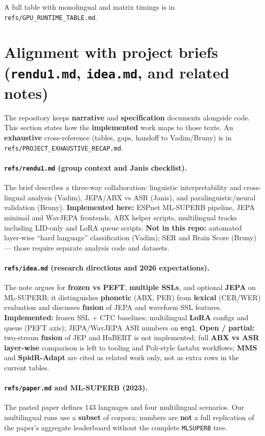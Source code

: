 \documentclass[11pt,a4paper]{article}
\begin{document}
\noindent A full table with monolingual and matrix timings is in \texttt{refs/GPU\_RUNTIME\_TABLE.md}.

\section{Alignment with project briefs (\texttt{rendu1.md}, \texttt{idea.md}, and related notes)}
The repository keeps \textbf{narrative} and \textbf{specification} documents alongside code. This section states how the \textbf{implemented} work maps to those texts. An \textbf{exhaustive} cross-reference (tables, gaps, handoff to Vadim/Bruny) is in \texttt{refs/PROJECT\_EXHAUSTIVE\_RECAP.md}.

\paragraph{\texttt{refs/rendu1.md} (group context and Janis checklist).}
The brief describes a three-way collaboration: linguistic interpretability and cross-lingual analysis (Vadim), JEPA/ABX vs ASR (Janis), and paralinguistic/neural validation (Bruny). \textbf{Implemented here:} ESPnet ML-SUPERB pipeline, JEPA minimal and WavJEPA frontends, ABX helper scripts, multilingual tracks including LID-only and LoRA queue scripts. \textbf{Not in this repo:} automated layer-wise ``hard language'' classification (Vadim); SER and Brain Score (Bruny) --- those require separate analysis code and datasets.

\paragraph{\texttt{refs/idea.md} (research directions and 2026 expectations).}
The note argues for \textbf{frozen vs PEFT}, \textbf{multiple SSLs}, and optional \textbf{JEPA} on ML-SUPERB; it distinguishes \textbf{phonetic} (ABX, PER) from \textbf{lexical} (CER/WER) evaluation and discusses \textbf{fusion} of JEPA and waveform SSL features. \textbf{Implemented:} frozen SSL + CTC baselines; multilingual \textbf{LoRA} configs and queue (PEFT axis); JEPA/WavJEPA ASR numbers on \texttt{eng1}. \textbf{Open / partial:} two-stream \textbf{fusion} of JEP and HuBERT is not implemented; full \textbf{ABX vs ASR layer-wise} comparison is left to tooling and Poli-style fastabx workflows; \textbf{MMS} and \textbf{SpidR-Adapt} are cited as related work only, not as extra rows in the current tables.

\paragraph{\texttt{refs/paper.md} and ML-SUPERB (2023).}
The pasted paper defines 143 languages and four multilingual scenarios. Our multilingual runs use a \textbf{subset} of corpora; numbers are \textbf{not} a full replication of the paper's aggregate leaderboard without the complete \texttt{MLSUPERB} tree.
\end{document}
